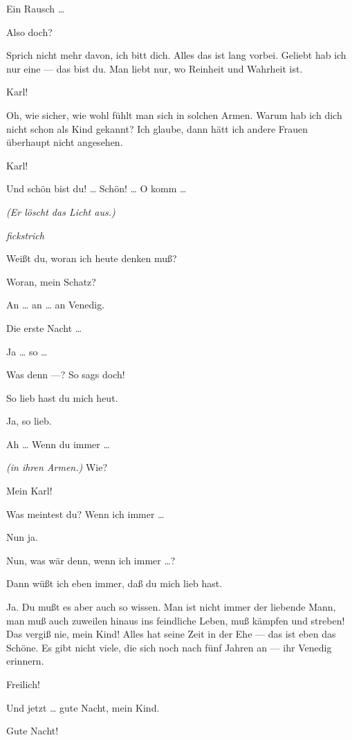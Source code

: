 \documentclass[
	final,
	a4paper,
	ngerman,
	mpinclude = true, %
	twoside = true,
	open = right,
	cleardoublepage = plain,
	DIV = 13,
	BCOR = 1cm,
	titlepage = firstiscover,
	]{scrbook}
\newcommand{\direction}[1]{\textit{(#1)}}
\newcommand{\hiat}{%
	\begin{center}
		\tiny
		\raisebox{0.5ex}{\rule{0.3\linewidth}{0.4pt}}
		\textit{fickstrich}
		\raisebox{0.5ex}{\rule{0.3\linewidth}{0.4pt}}
	\end{center}
}
\newcommand{\thecharacter}[1]{\textup{\textsc{#1}}\xspace}
\newcommand{\thefrau}{\thecharacter{Junge Frau}}
\newcommand{\thegatte}{\thecharacter{Gatte}}
\newcommand{\character}[1]{\item[#1:]}
\newcommand{\frau}{\character{\thefrau}}
\newcommand{\gatte}{\character{\thegatte}}
\begin{document}
\begin{play}
	\gatte
	Ein Rausch \ldots{}

	\frau
	Also doch?

	\gatte
	Sprich nicht mehr davon, ich bitt dich. Alles das ist lang vorbei. Geliebt hab ich nur eine --- das bist du. Man liebt nur, wo Reinheit und Wahrheit ist.

	\frau
	Karl!

	\gatte
	Oh, wie sicher, wie wohl fühlt man sich in solchen Armen. Warum hab ich dich nicht schon als Kind gekannt? Ich glaube, dann hätt ich andere Frauen überhaupt nicht angesehen.

	\frau
	Karl!

	\gatte
	Und schön bist du! \ldots{} Schön! \ldots{} O komm \ldots{}

	\direction{Er löscht das Licht aus.}

	\hiat

	\frau
	Weißt du, woran ich heute denken muß?

	\gatte
	Woran, mein Schatz?

	\frau
	An \ldots{} an \ldots{} an Venedig.

	\gatte
	Die erste Nacht \ldots{}

	\frau
	Ja \ldots{} so \ldots{}

	\gatte
	Was denn ---? So sags doch!

	\frau
	So lieb hast du mich heut.

	\gatte
	Ja, so lieb.

	\frau
	Ah \ldots{} Wenn du immer \ldots{}

	\gatte
	\direction{in ihren Armen.} Wie?

	\frau
	Mein Karl!

	\gatte
	Was meintest du? Wenn ich immer \ldots{}

	\frau
	Nun ja.

	\gatte
	Nun, was wär denn, wenn ich immer \ldots{}?

	\frau
	Dann wüßt ich eben immer, daß du mich lieb hast.

	\gatte
	Ja. Du mußt es aber auch so wissen. Man ist nicht immer der liebende Mann, man muß auch zuweilen hinaus ins feindliche Leben, muß kämpfen und streben! Das vergiß nie, mein Kind! Alles hat seine Zeit in der Ehe --- das ist eben das Schöne. Es gibt nicht viele, die sich noch nach fünf Jahren an --- ihr Venedig erinnern.

	\frau
	Freilich!

	\gatte
	Und jetzt \ldots{} gute Nacht, mein Kind.

	\frau
	Gute Nacht!

\end{play}
\end{document}
